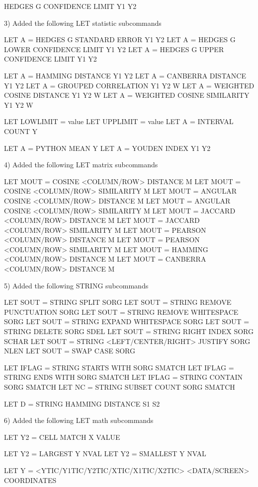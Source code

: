       HEDGES G CONFIDENCE LIMIT Y1 Y2

 3) Added the following LET statistic subcommands

      LET A  = HEDGES G STANDARD ERROR Y1 Y2
      LET A  = HEDGES G LOWER CONFIDENCE LIMIT Y1 Y2
      LET A  = HEDGES G UPPER CONFIDENCE LIMIT Y1 Y2

      LET A  = HAMMING DISTANCE Y1 Y2
      LET A  = CANBERRA DISTANCE Y1 Y2
      LET A  = GROUPED CORRELATION Y1 Y2 W
      LET A  = WEIGHTED COSINE DISTANCE Y1 Y2 W
      LET A  = WEIGHTED COSINE SIMILARITY Y1 Y2 W

      LET LOWLIMIT = value
      LET UPPLIMIT = value
      LET A = INTERVAL COUNT Y

      LET A = PYTHON MEAN Y
      LET A = YOUDEN INDEX Y1 Y2

 4) Added the following LET matrix subcommands

      LET MOUT = COSINE <COLUMN/ROW> DISTANCE M
      LET MOUT = COSINE <COLUMN/ROW> SIMILARITY M
      LET MOUT = ANGULAR COSINE <COLUMN/ROW> DISTANCE M
      LET MOUT = ANGULAR COSINE <COLUMN/ROW> SIMILARITY M
      LET MOUT = JACCARD <COLUMN/ROW> DISTANCE M
      LET MOUT = JACCARD <COLUMN/ROW> SIMILARITY M
      LET MOUT = PEARSON <COLUMN/ROW> DISTANCE M
      LET MOUT = PEARSON <COLUMN/ROW> SIMILARITY M
      LET MOUT = HAMMING <COLUMN/ROW> DISTANCE M
      LET MOUT = CANBERRA <COLUMN/ROW> DISTANCE M

 5) Added the following STRING subcommands

      LET SOUT = STRING SPLIT SORG
      LET SOUT = STRING REMOVE PUNCTUATION SORG
      LET SOUT = STRING REMOVE WHITESPACE SORG
      LET SOUT = STRING EXPAND WHITESPACE SORG
      LET SOUT = STRING DELETE SORG SDEL
      LET SOUT = STRING RIGHT INDEX SORG  SCHAR
      LET SOUT = STRING <LEFT/CENTER/RIGHT> JUSTIFY SORG NLEN
      LET SOUT = SWAP CASE SORG

      LET IFLAG = STRING STARTS WITH SORG SMATCH
      LET IFLAG = STRING ENDS   WITH SORG SMATCH
      LET IFLAG = STRING CONTAIN SORG SMATCH
      LET NC    = STRING SUBSET COUNT SORG SMATCH

      LET D = STRING HAMMING DISTANCE S1 S2

 6) Added the following LET math subcommands

      LET Y2 = CELL MATCH X VALUE

      LET Y2 = LARGEST Y NVAL
      LET Y2 = SMALLEST Y NVAL

      LET Y = <YTIC/Y1TIC/Y2TIC/XTIC/X1TIC/X2TIC>  <DATA/SCREEN> COORDINATES

